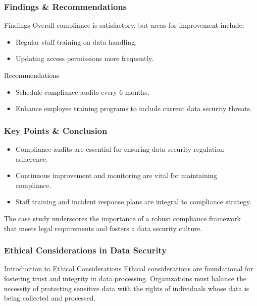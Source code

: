 \documentclass{beamer}
\begin{document}
\begin{frame}[fragile]
    \frametitle{Findings \& Recommendations}
    \begin{block}{Findings}
        Overall compliance is satisfactory, but areas for improvement include:
        \begin{itemize}
            \item Regular staff training on data handling.
            \item Updating access permissions more frequently.
        \end{itemize}
    \end{block}
    
    \begin{block}{Recommendations}
        \begin{itemize}
            \item Schedule compliance audits every 6 months.
            \item Enhance employee training programs to include current data security threats.
        \end{itemize}
    \end{block}
\end{frame}

\begin{frame}[fragile]
    \frametitle{Key Points \& Conclusion}
    \begin{itemize}
        \item Compliance audits are essential for ensuring data security regulation adherence.
        \item Continuous improvement and monitoring are vital for maintaining compliance.
        \item Staff training and incident response plans are integral to compliance strategy.
    \end{itemize}
    The case study underscores the importance of a robust compliance framework that meets legal requirements and fosters a data security culture.
\end{frame}

\begin{frame}[fragile]
    \frametitle{Ethical Considerations in Data Security}
    \begin{block}{Introduction to Ethical Considerations}
        Ethical considerations are foundational for fostering trust and integrity in data processing. Organizations must balance the necessity of protecting sensitive data with the rights of individuals whose data is being collected and processed.
    \end{block}
\end{frame}
\end{document}
